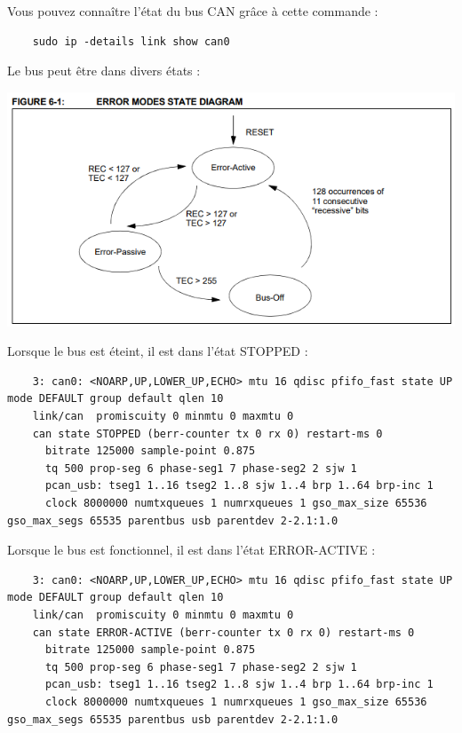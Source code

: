 Vous pouvez connaître l'état du bus CAN grâce à cette commande :
\vspace{-1.8\baselineskip} 
\begin{lstlisting}
    sudo ip -details link show can0
\end{lstlisting}

Le bus peut être dans divers états : \\
\begin{minipage}
    \textwidth
    \centering
    \includegraphics{../figures/Etat_CAN.png}
\end{minipage}

\medspace

Lorsque le bus est éteint, il est dans l'état STOPPED :
\vspace{-1.8\baselineskip} 
\begin{lstlisting}
    3: can0: <NOARP,UP,LOWER_UP,ECHO> mtu 16 qdisc pfifo_fast state UP mode DEFAULT group default qlen 10
    link/can  promiscuity 0 minmtu 0 maxmtu 0 
    can state STOPPED (berr-counter tx 0 rx 0) restart-ms 0 
	  bitrate 125000 sample-point 0.875 
	  tq 500 prop-seg 6 phase-seg1 7 phase-seg2 2 sjw 1
	  pcan_usb: tseg1 1..16 tseg2 1..8 sjw 1..4 brp 1..64 brp-inc 1
	  clock 8000000 numtxqueues 1 numrxqueues 1 gso_max_size 65536 gso_max_segs 65535 parentbus usb parentdev 2-2.1:1.0  
\end{lstlisting}


Lorsque le bus est fonctionnel, il est dans l'état ERROR-ACTIVE :
\vspace{-1.8\baselineskip} 
\begin{lstlisting}
    3: can0: <NOARP,UP,LOWER_UP,ECHO> mtu 16 qdisc pfifo_fast state UP mode DEFAULT group default qlen 10
    link/can  promiscuity 0 minmtu 0 maxmtu 0 
    can state ERROR-ACTIVE (berr-counter tx 0 rx 0) restart-ms 0 
	  bitrate 125000 sample-point 0.875 
	  tq 500 prop-seg 6 phase-seg1 7 phase-seg2 2 sjw 1
	  pcan_usb: tseg1 1..16 tseg2 1..8 sjw 1..4 brp 1..64 brp-inc 1
	  clock 8000000 numtxqueues 1 numrxqueues 1 gso_max_size 65536 gso_max_segs 65535 parentbus usb parentdev 2-2.1:1.0  
\end{lstlisting}

